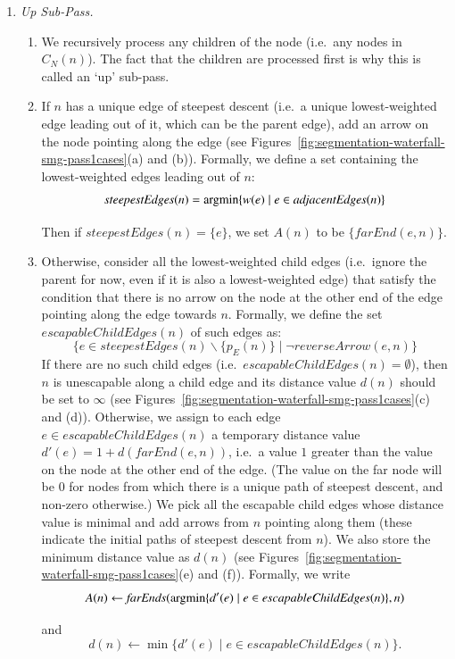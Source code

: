 \documentclass[preprint,a4paper]{elsarticle}
\newcommand{\argmin}{\operatornamewithlimits{argmin}}
\newcommand{\funcname}[1]{\mathit{#1}}
\begin{document}
\begin{enumerate}

\item \emph{Up Sub-Pass.}

\begin{enumerate}
\item We recursively process any children of the node (i.e.~any nodes in $C_N(n)$). The fact that the children are processed first is why this is called an `up' sub-pass.

\item If $n$ has a unique edge of steepest descent (i.e.~a unique lowest-weighted edge leading out of it, which can be the parent edge), add an arrow on the node pointing along the edge (see Figures~\ref{fig:segmentation-waterfall-smg-pass1cases}(a) and (b)). Formally, we define a set containing the lowest-weighted edges leading out of $n$:
%
\[
\funcname{steepestEdges}(n) = \argmin_{}\{w(e) \; | \; e \in \funcname{adjacentEdges}(n)\}
\]
%
Then if $\funcname{steepestEdges}(n) = \{e\}$, we set $A(n)$ to be $\{\funcname{farEnd}(e,n)\}$.

\item Otherwise, consider all the lowest-weighted child edges (i.e.~ignore the parent for now, even if it is also a lowest-weighted edge) that satisfy the condition that there is no arrow on the node at the other end of the edge pointing along the edge towards $n$. Formally, we define the set $\funcname{escapableChildEdges}(n)$ of such edges as:
%
\[
\{e \in \funcname{steepestEdges}(n) \backslash \{p_E(n)\} \; | \; \neg \funcname{reverseArrow}(e,n)\}
\]
%
If there are no such child edges (i.e.~$\funcname{escapableChildEdges}(n) = \emptyset$), then $n$ is unescapable along a child edge and its distance value $d(n)$ should be set to $\infty$ (see Figures~\ref{fig:segmentation-waterfall-smg-pass1cases}(c) and (d)). Otherwise, we assign to each edge $e \in \funcname{escapableChildEdges}(n)$ a temporary distance value $d'(e) = 1 + d(\funcname{farEnd}(e,n))$, i.e.~a value $1$ greater than the value on the node at the other end of the edge. (The value on the far node will be $0$ for nodes from which there is a unique path of steepest descent, and non-zero otherwise.) We pick all the escapable child edges whose distance value is minimal and add arrows from $n$ pointing along them (these indicate the initial paths of steepest descent from $n$). We also store the minimum distance value as $d(n)$ (see Figures~\ref{fig:segmentation-waterfall-smg-pass1cases}(e) and (f)). Formally, we write
%
\[
A(n) \leftarrow \funcname{farEnds}(\argmin_{}\{d'(e) \; | \; e \in \funcname{escapableChildEdges}(n)\}, n)
\]
%
and
\[
d(n) \leftarrow \min_{}\{d'(e) \; | \; e \in \funcname{escapableChildEdges}(n)\}.
\]


\end{enumerate}
\end{enumerate}
\end{document}
